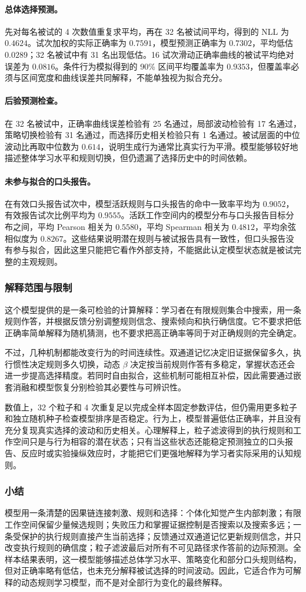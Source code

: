\paragraph{总体选择预测。}
先对每名被试的 4 次数值重复求平均，再在 32 名被试间平均，得到的 NLL 为 $0.4624$。试次加权的实际正确率为 $0.7591$，模型预测正确率为 $0.7302$，平均低估 $0.0289$；32 名被试中有 31 名出现低估。16 试次滑动正确率曲线的被试平均绝对误差为 $0.0816$。条件行为模拟得到的 90\% 区间平均覆盖率为 $0.9353$，但覆盖率必须与区间宽度和曲线误差共同解释，不能单独视为拟合充分。

\paragraph{后验预测检查。}
在 32 名被试中，正确率曲线误差检验有 25 名通过，局部波动检验有 17 名通过，策略切换检验有 31 名通过，而选择历史相关检验只有 1 名通过。被试层面的中位波动比再取中位数为 $0.614$，说明生成行为通常比真实行为平滑。模型能够较好地描述整体学习水平和规则切换，但仍遗漏了选择历史中的时间依赖。

\paragraph{未参与拟合的口头报告。}
在有效口头报告试次中，模型活跃规则与口头报告的命中一致率平均为 $0.9052$，有效报告试次比例平均为 $0.9555$。活跃工作空间内的模型分布与口头报告目标分布之间，平均 Pearson 相关为 $0.5580$，平均 Spearman 相关为 $0.4812$，平均余弦相似度为 $0.8267$。这些结果说明潜在规则与被试报告具有一致性，但口头报告没有参与拟合，因此这里只能把它看作外部支持，不能据此认定模型状态就是被试完整的主观规则。


\subsubsection{解释范围与限制}

这个模型提供的是一条可检验的计算解释：学习者在有限规则集合中搜索，用一条规则作答，并根据反馈分别调整规则信念、搜索倾向和执行确信度。它不要求把低正确率简单解释为随机猜测，也不要求把高正确率等同于对正确规则的完全确定。

不过，几种机制都能改变行为的时间连续性。双通道记忆决定旧证据保留多久，执行惯性决定规则多久切换，动态 $\beta$ 决定按当前规则作答有多稳定，掌握状态还会进一步提高选择精度。若同时自由拟合，这些机制可能相互补偿，因此需要通过嵌套消融和模型恢复分别检验其必要性与可辨识性。

数值上，32 个粒子和 4 次重复足以完成全样本固定参数评估，但仍需用更多粒子和独立随机种子检查模型排序是否稳定。行为上，模型普遍低估正确率，并且没有充分复现真实选择的波动和历史相关。心理解释上，粒子滤波得到的执行规则和工作空间只是与行为相容的潜在状态；只有当这些状态还能稳定预测独立的口头报告、反应时或实验操纵效应时，才能把它们更强地解释为学习者实际采用的认知规则。


\subsubsection{小结}

模型用一条清楚的因果链连接刺激、规则和选择：个体化知觉产生内部刺激；有限工作空间保留少量候选规则；失败压力和掌握证据控制是否搜索以及搜索多远；一条受保护的执行规则直接产生当前选择；反馈通过双通道记忆更新规则信念，并只改变执行规则的确信度；粒子滤波最后对所有不可见路径求作答前的边际预测。全样本结果表明，这一模型能够描述总体学习水平、策略变化和部分口头规则结构，但对正确率略有低估，也未充分解释被试选择的时间波动。因此，它适合作为可解释的动态规则学习模型，而不是对全部行为变化的最终解释。
